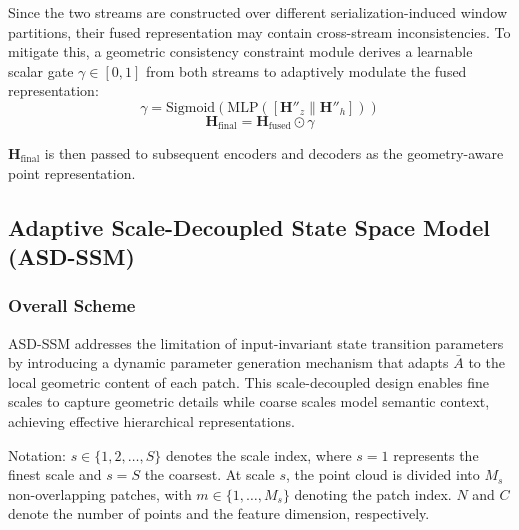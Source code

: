 \documentclass[a4paper,fleqn]{cas-sc}
\begin{document}
Since the two streams are constructed over different serialization-induced window partitions, their fused representation may contain cross-stream inconsistencies. To mitigate this, a geometric consistency constraint module derives a learnable scalar gate $\gamma \in [0,1]$ from both streams to adaptively modulate the fused representation:
\begin{equation}
	\gamma = \text{Sigmoid}(\text{MLP}([\mathbf{H}''_z \| \mathbf{H}''_h]))
\end{equation}
\begin{equation}
	\mathbf{H}_{\text{final}} = \mathbf{H}_{\text{fused}} \odot \gamma
\end{equation}

$\mathbf{H}_{\text{final}}$ is then passed to subsequent encoders and decoders as the geometry-aware point representation.


\subsection{Adaptive Scale-Decoupled State Space Model (ASD-SSM)}

\subsubsection{Overall Scheme}
ASD-SSM addresses the limitation of input-invariant state transition parameters  by introducing a dynamic parameter generation mechanism that adapts $\bar{A}$ to the local geometric content of each patch. This scale-decoupled design enables fine scales to capture geometric details while coarse scales model semantic context, achieving effective hierarchical representations.

Notation: $s \in \{1, 2, \ldots, S\}$ denotes the scale index, where $s=1$ represents the finest scale and $s=S$ the coarsest. At scale $s$, the point cloud is divided into $M_s$ non-overlapping patches, with $m \in \{1, \ldots, M_s\}$ denoting the patch index. $N$ and $C$ denote the number of points and the feature dimension, respectively.
\end{document}
